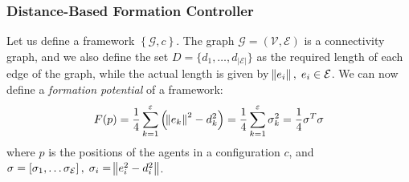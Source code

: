 \documentclass{iacas}
\newtheorem{definition}{Definition}
\begin{document}

\subsubsection{Distance-Based Formation Controller}
Let us define a framework $\left\{\mathcal{G}, c \right\}$. The graph $\mathcal{G} = (\mathcal{V}, \mathcal{E})$ is a connectivity graph, and we also define the set $D = \{d_1, \ldots, d_{|\mathcal{E}|}\}$ as the required length of each edge of the graph, while the actual length is given by $\norm{e_i},\; e_i \in \mathcal{E}$. We can now define a \emph{formation potential} of a framework:
\begin{equation}
F(p) = \frac{1}{4}\sum_{k=1}^{\varepsilon}\left( \norm{e_k}^2 - d_{k}^{2} \right) = \frac{1}{4}\sum_{k=1}^{\varepsilon} \sigma_k^2 = \frac{1}{4}\sigma^T \sigma
\label{eq:formation potential}
\end{equation}
where $p$ is the positions of the agents in a configuration $c$, and $\sigma = \left[\sigma_1, \ldots \sigma_\mathcal{E} \right], \; \sigma_i = \norm{e_i^2 - d_{i}^{2}}$.
\end{document}
